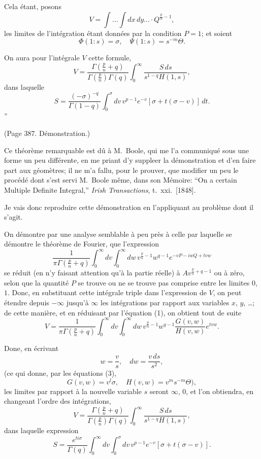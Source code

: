 \documentclass[11pt,a4paper]{article}
\theoremstyle{plain}
\theoremstyle{definition}
\begin{document}
Cela \'{e}tant, posons
\[
V = \int \ldots \int dx\,dy\ldots \cdot Q^{\frac{p}{n}-1}, \tag{2}
\]
les limites de l'int\'{e}gration \'{e}tant donn\'{e}es par la condition $P = 1$; et soient
\[
\Phi(1:s) = \sigma, \quad \Psi(1:s) = s^{-m}\Theta. \tag{3}
\]

On aura pour l'int\'{e}grale $V$ cette formule,
\[
V = \frac{\Gamma(\tfrac{p}{n} + q)}{\Gamma(\tfrac{p}{n})\Gamma(q)}
\int_0^\infty \frac{S\,ds}{s^{1-q}H(1,s)}, \tag{4}
\]
dans laquelle
\[
S = \frac{(-\sigma)^{-q}}{\Gamma(1-q)} \int_0^\sigma dv\,v^{p-1} e^{-v}[\sigma + t(\sigma - v)]\,dt. \tag{5}
\]''

(Page 387. D\'{e}monstration.)

Ce th\'{e}or\`{e}me remarquable est d\^{u} \`{a} M.~Boole, qui me l'a communiqu\'{e} sous une
forme un peu diff\'{e}rente, en me priant d'y suppleer la d\'{e}monstration et d'en faire
part aux g\'{e}om\`{e}tres; il ne m'a fallu, pour le prouver, que modifier un peu le proc\'{e}d\'{e}
dont s'est servi M.~Boole m\^{e}me, dans son M\'{e}moire: ``On a certain Multiple Definite
Integral,'' \textit{Irish Transactions}, t.~xxi.\ [1848].

Je vais donc reproduire cette d\'{e}monstration en l'appliquant au probl\`{e}me dont il s'agit.

On d\'{e}montre par une analyse semblable \`{a} peu pr\`{e}s \`{a} celle par laquelle se d\'{e}montre
le th\'{e}or\`{e}me de Fourier, que l'expression
\[
\frac{1}{\pi\Gamma(\tfrac{p}{n}+q)} \int_0^\infty dv \int_0^\infty dw \, v^{\frac{p}{n}-1} w^{q-1} e^{-vP - iwQ + tvw}
\]
se r\'{e}duit (en n'y faisant attention qu'\`{a} la partie r\'{e}elle) \`{a} $A v^{\frac{p}{n}+q-1}$ ou \`{a} z\'{e}ro, selon que
la quantit\'{e} $P$ se trouve ou ne se trouve pas comprise entre les limites $0$, $1$. Donc,
en substituant cette int\'{e}grale triple dans l'expression de $V$, on peut \'{e}tendre depuis
$-\infty$ jusqu'\`{a} $\infty$ les int\'{e}grations par rapport aux variables $x$, $y$, \ldots; de cette mani\`{e}re,
et en r\'{e}duisant par l'\'{e}quation (1), on obtient tout de suite
\[
V = \frac{1}{\pi\Gamma(\tfrac{p}{n}+q)}
\int_0^\infty dv \int_0^\infty dw \, v^{\frac{p}{n}-1} w^{q-1} \frac{G(v,w)}{H(v,w)} e^{tvw}. \tag{7}
\]

Done, en \'{e}crivant
\[
w = \frac{v}{s}, \quad dw = \frac{v\,ds}{s^2},
\]
(ce qui donne, par les \'{e}quations (3),
\[
G(v,w) = v^l\sigma, \quad H(v,w) = v^m s^{-m}\Theta),
\]
les limites par rapport \`{a} la nouvelle variable $s$ seront $\infty$, $0$, et l'on obtiendra, en
changeant l'ordre des int\'{e}grations,
\[
V = \frac{\Gamma(\tfrac{p}{n}+q)}{\Gamma(\tfrac{p}{n})\Gamma(q)}
\int_0^\infty \frac{S\,ds}{s^{1-q}H(1,s)},
\]
dans laquelle expression
\[
S = \frac{e^{ti\sigma}}{\Gamma(q)} \int_0^\infty dv \int_0^\sigma dv\,v^{p-1} e^{-v}[\sigma + t(\sigma - v)]. \tag{9}
\]
\end{document}

